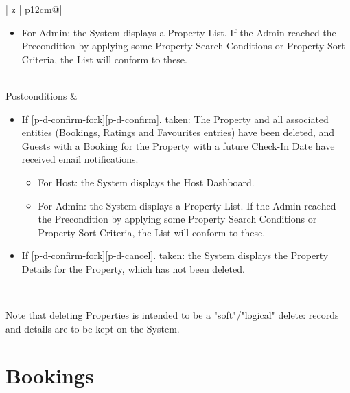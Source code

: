 \begin{table}[H]
\begin{tabular}{| z | p{12cm}@\qquad |}
\begin{enumerate}
\begin{itemize}
                \item For Admin: the System displays a Property List. If the Admin reached the Precondition by applying some Property Search Conditions or Property Sort Criteria, the List will conform to these.
            \end{itemize}
        \end{enumerate}
        \\ \hline
        Postconditions &
        \begin{itemize}
            \item If \ref{p-d-confirm-fork}\ref{p-d-confirm}. taken: The Property and all associated entities (Bookings, Ratings and Favourites entries) have been deleted, and Guests with a Booking for the Property with a future Check-In Date have received email notifications.
            \begin{itemize}
                \item For Host: the System displays the Host Dashboard.
                \item For Admin: the System displays a Property List. If the Admin reached the Precondition by applying some Property Search Conditions or Property Sort Criteria, the List will conform to these.
            \end{itemize}
            \item If \ref{p-d-confirm-fork}\ref{p-d-cancel}. taken: the System displays the Property Details for the Property, which has not been deleted.
        \end{itemize}
         \\ \hline
    \end{tabular}
    \caption{Use Case P-D: Delete Property}
    \label{use_case_p-d}
  \end{table}

  Note that deleting Properties is intended to be a "soft"/"logical" delete: records and details are to be kept on the System.

\section{Bookings}

